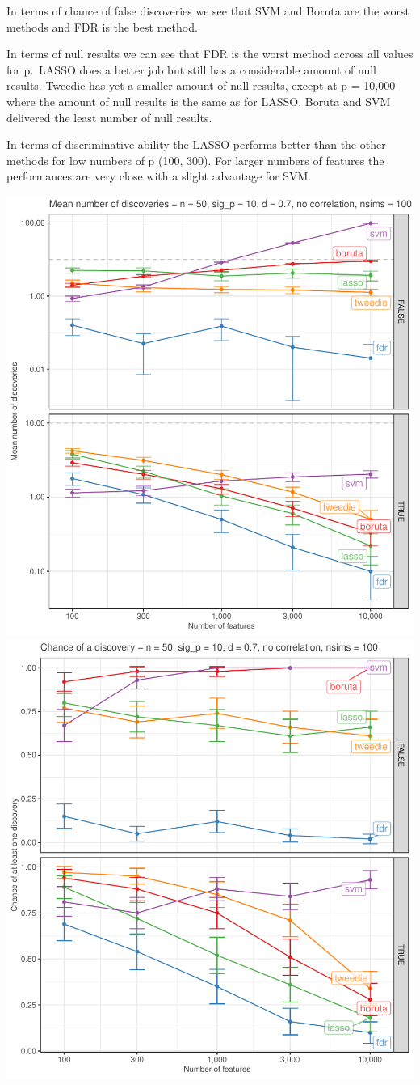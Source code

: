 \documentclass[
]{article}
\begin{document}
In terms of chance of false discoveries we see that SVM and Boruta are the worst methods and FDR is the best method.

In terms of null results we can see that FDR is the worst method across all values for p.~LASSO does a better job but still has a considerable amount of null results. Tweedie has yet a smaller amount of null results, except at p = 10,000 where the amount of null results is the same as for LASSO. Boruta and SVM delivered the least number of null results.

In terms of discriminative ability the LASSO performs better than the other methods for low numbers of p (100, 300). For larger numbers of features the performances are very close with a slight advantage for SVM.

\begin{center}\includegraphics[width=0.49\linewidth]{main_files/figure-latex/unnamed-chunk-41-1} \includegraphics[width=0.49\linewidth]{main_files/figure-latex/unnamed-chunk-41-2} \end{center}
\end{document}
